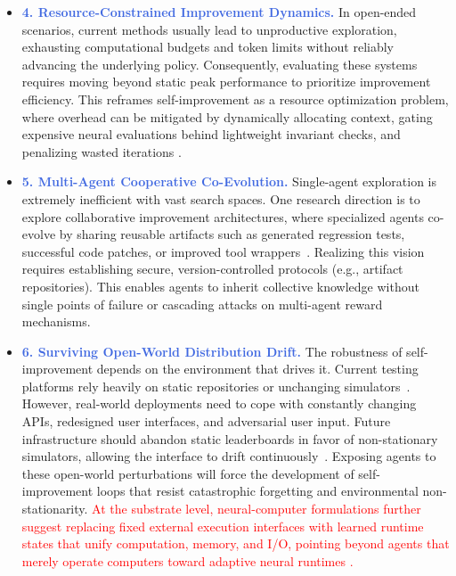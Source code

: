 \begin{itemize}[leftmargin=*, label={}, itemsep=0.9em, topsep=0.2em]
\item \textbf{\textcolor{RoyalBlue}{4. Resource-Constrained Improvement Dynamics.}} 
In open-ended scenarios, current methods usually lead to unproductive exploration, exhausting computational budgets and token limits without reliably advancing the underlying policy. Consequently, evaluating these systems requires moving beyond static peak performance to prioritize improvement efficiency. This reframes self-improvement as a resource optimization problem, where overhead can be mitigated by dynamically allocating context, gating expensive neural evaluations behind lightweight invariant checks, and  penalizing wasted iterations \citep{feng2026agentocrreimaginingagenthistory}.


\item \textbf{\textcolor{RoyalBlue}{5. Multi-Agent Cooperative Co-Evolution.}} Single-agent exploration is extremely inefficient with vast search spaces. One research direction is to explore collaborative improvement architectures, where specialized agents co-evolve by sharing reusable artifacts such as generated regression tests, successful code patches, or improved tool wrappers~\citep{chen2025multiagentevolvellmselfimprove, wang2026metagenselfevolvingrolestopologies}. Realizing this vision requires establishing secure, version-controlled protocols (e.g., artifact repositories). This enables agents to inherit collective knowledge without single points of failure or cascading attacks on multi-agent reward mechanisms.


\item \textbf{\textcolor{RoyalBlue}{6. Surviving Open-World Distribution Drift.}} The robustness of self-improvement depends on the environment that drives it. Current testing platforms  rely heavily on static repositories or unchanging simulators~\citep{sunil2026memorypoisoningattackdefense}. However, real-world deployments need to cope with constantly changing APIs, redesigned user interfaces, and adversarial user input. Future infrastructure should abandon static leaderboards in favor of non-stationary simulators, allowing the interface to drift continuously~\citep{anonymous2026gaia}. Exposing agents to these open-world perturbations will force the development of self-improvement loops that resist catastrophic forgetting and environmental non-stationarity. \textcolor{red}{At the substrate level, neural-computer formulations further suggest replacing fixed external execution interfaces with learned runtime states that unify computation, memory, and I/O, pointing beyond agents that merely operate computers toward adaptive neural runtimes \citep{zhuge2026neural, rivard2026neuralossimulatingoperatingsystems}.}
\end{itemize}

